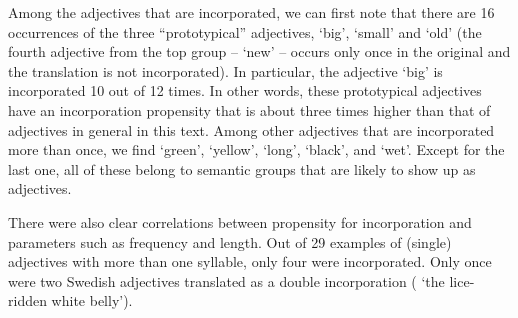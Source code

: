 
Among the adjectives that are incorporated, we can first note that there are 16 occurrences of the three “prototypical” adjectives,  ‘big’,  ‘small’ and ‘old’ (the fourth adjective from the top group –  ‘new’ – occurs only once in the original and the translation is not incorporated). In particular, the adjective  ‘big’ is incorporated 10 out of 12 times. In other words, these prototypical adjectives have an incorporation propensity that is about three times higher than that of adjectives in general in this text. Among other adjectives that are incorporated more than once, we find  ‘green’,  ‘yellow’,  ‘long’,  ‘black’, and  ‘wet’. Except for the last one, all of these belong to semantic groups that are likely to show up as adjectives.


There were also clear correlations between propensity for incorporation and parameters such as frequency and length. Out of 29 examples of (single) adjectives with more than one syllable, only four were incorporated. Only once were two Swedish adjectives translated as a double incorporation ( ‘the lice-ridden white belly’).


